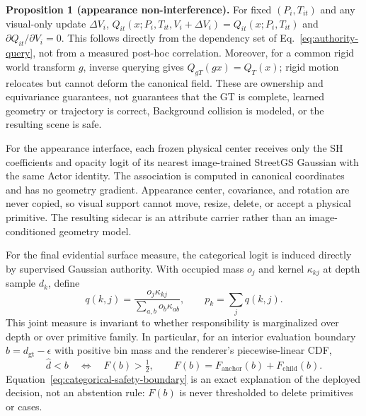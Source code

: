 \noindent\textbf{Proposition 1 (appearance non-interference).}
For fixed $(P_i,T_{it})$ and any visual-only update $\Delta V_i$,
$Q_{it}(x;P_i,T_{it},V_i+\Delta V_i)=Q_{it}(x;P_i,T_{it})$ and
$\partial Q_{it}/\partial V_i=0$.
This follows directly from the dependency set of Eq.~\ref{eq:authority-query}, not from a measured post-hoc correlation. Moreover, for a common rigid world transform $g$, inverse querying gives $Q_{gT}(gx)=Q_T(x)$; rigid motion relocates but cannot deform the canonical field. These are ownership and equivariance guarantees, not guarantees that the GT is complete, learned geometry or trajectory is correct, Background collision is modeled, or the resulting scene is safe.

For the appearance interface, each frozen physical center receives only the SH coefficients and opacity logit of its nearest image-trained StreetGS Gaussian with the same Actor identity. The association is computed in canonical coordinates and has no geometry gradient. Appearance center, covariance, and rotation are never copied, so visual support cannot move, resize, delete, or accept a physical primitive. The resulting sidecar is an attribute carrier rather than an image-conditioned geometry model.

For the final evidential surface measure, the categorical logit is induced directly by supervised Gaussian authority. With
occupied mass $o_j$ and kernel $\kappa_{kj}$ at depth sample $d_k$, define
\begin{equation}
q(k,j)=\frac{o_j\kappa_{kj}}{\sum_{a,b}o_b\kappa_{ab}},\qquad
p_k=\sum_jq(k,j).
\end{equation}
This joint measure is invariant to whether responsibility is marginalized over depth or over primitive family. In particular,
for an interior evaluation boundary $b=d_{\mathrm{gt}}-\epsilon$ with positive bin mass and the renderer's piecewise-linear CDF,
\begin{equation}
\widehat d<b\quad\Longleftrightarrow\quad F(b)>\tfrac12,\qquad
F(b)=F_{\mathrm{anchor}}(b)+F_{\mathrm{child}}(b).
\label{eq:categorical-safety-boundary}
\end{equation}
Equation~\ref{eq:categorical-safety-boundary} is an exact explanation of the deployed decision, not an abstention rule:
$F(b)$ is never thresholded to delete primitives or cases.

